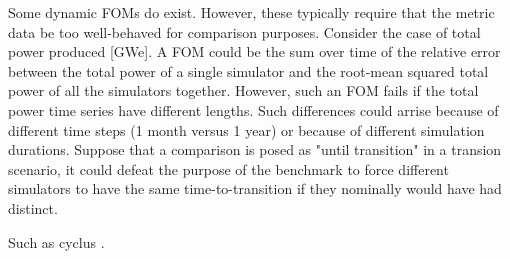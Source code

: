 Some dynamic FOMs do exist. However, these typically require that the metric
data be too well-behaved for comparison purposes. Consider the case of total
power produced [GWe]. A FOM could be the sum over time of the relative error 
between the total power of a single simulator and the root-mean squared total power
of all the simulators together. However, such an FOM fails if the total power
time series have different lengths. Such differences could arrise because 
of different time steps (1 month versus 1 year) or because of different 
simulation durations. Suppose that a comparison is posed as "until transition"
in a transion scenario, it could defeat the purpose of the benchmark to
force different simulators to have the same time-to-transition if they 
nominally would have had distinct. 
 



Such as cyclus \cite{cyclus_v1_2}.